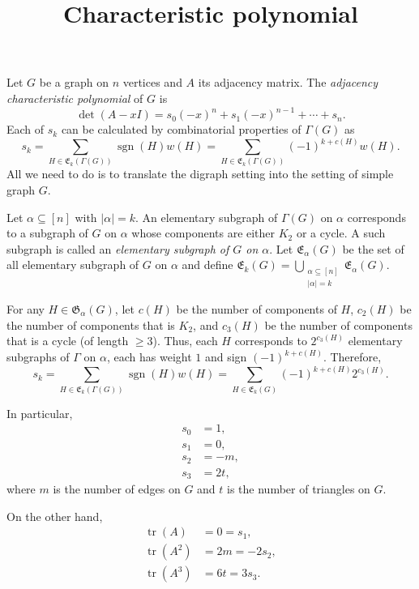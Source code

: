 \documentclass{article}
\title{Characteristic polynomial}
\date{\vspace{-1cm}}
\newcommand{\tr}{\operatorname{tr}}
\newcommand{\sgn}{\operatorname{sgn}}
\theoremstyle{definition}
\begin{document}
\maketitle
\large

Let $G$ be a graph on $n$ vertices and $A$ its adjacency matrix.  The \emph{adjacency characteristic polynomial} of $G$ is 
\[\det(A - xI) = s_0(-x)^n + s_1(-x)^{n-1} + \cdots + s_n.\]
Each of $s_k$ can be calculated by combinatorial properties of $\Gamma(G)$ as
\[s_k = \sum_{H\in\mathfrak{E}_k(\Gamma(G))} \sgn(H)w(H) = \sum_{H\in\mathfrak{E}_k(\Gamma(G))}(-1)^{k+c(H)}w(H).\]
All we need to do is to translate the digraph setting into the setting of simple graph $G$.  

Let $\alpha\subseteq[n]$ with $|\alpha| = k$.  An elementary subgraph of $\Gamma(G)$ on $\alpha$ corresponds to a subgraph of $G$ on $\alpha$ whose components are either $K_2$ or a cycle.  A such subgraph is called an \emph{elementary subgraph of $G$ on $\alpha$}.  Let $\mathfrak{E}_\alpha(G)$ be the set of all elementary subgraph of $G$ on $\alpha$ and define $\mathfrak{E}_k(G) = \bigcup_{\substack{\alpha\subseteq [n]\\|\alpha| = k}}\mathfrak{E}_\alpha(G)$.    

For any $H\in\mathfrak{G}_\alpha(G)$, let $c(H)$ be the number of components of $H$, $c_2(H)$ be the number of components that is $K_2$, and $c_3(H)$ be the number of components that is a cycle (of length $\geq 3$).  Thus, each $H$ corresponds to $2^{c_3(H)}$ elementary subgraphs of $\Gamma$ on $\alpha$, each has weight $1$ and sign $(-1)^{k + c(H)}$.  Therefore, 
\[s_k = \sum_{H\in\mathfrak{E}_k(\Gamma(G))} \sgn(H)w(H) = \sum_{H\in\mathfrak{E}_k(G)}(-1)^{k+c(H)}2^{c_3(H)}.\]

In particular, 
\[\begin{aligned}
s_0 &= 1, \\
s_1 &= 0, \\
s_2 &= -m, \\
s_3 &= 2t,
\end{aligned}\]
where $m$ is the number of edges on $G$ and $t$ is the number of triangles on $G$.

On the other hand, 
\[\begin{aligned}
\tr(A) &= 0 = s_1, \\
\tr(A^2) &= 2m = -2s_2, \\
\tr(A^3) &= 6t = 3s_3.
\end{aligned}\]
\end{document}
